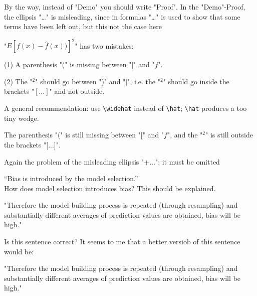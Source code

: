 \begin{description}[style=unboxed,leftmargin=0cm,itemsep=3ex]
By the way, instead of "Demo" you should write "Proof".
In the "Demo"-Proof, the ellipsis "\dots" is misleading, since in formulas
"\dots" is used to show that some terms have been left out, but this not
the case here 





\quad
"$E[f(x)-\widehat{f}(x))]^2$" has two mistakes:

(1) A parenthesis "(" is missing between "[" and "$f$".

(2) The "${}^2$" should go between ")" and "]", i.e. the "${}^2$" should
go inside the brackets "$[\dots]$" and not outside.

A general recommendation: use \verb!\widehat! instead of \verb!\hat!;
\verb!\hat! produces a too tiny wedge.

\quad
The parenthesis "(" is still missing between "[" and "$f$", and the
"${}^2$" is still outside the brackets "[...]".

Again the problem of the misleading ellipsis "$+\dots$";
it must be omitted



``Bias is introduced by the model selection.'' \\
How does model selection introduces bias?
This should be explained.


"Therefore the model building process is repeated (through resampling)
and substantially different averages of prediction values are obtained,
bias will be high." 

Is this sentence correct?
It seems to me that a better versiob of this sentence would be:

"Therefore the model building process is repeated (through
resampling) and substantially different averages of prediction values
are obtained,  bias will be high."


\end{description}
